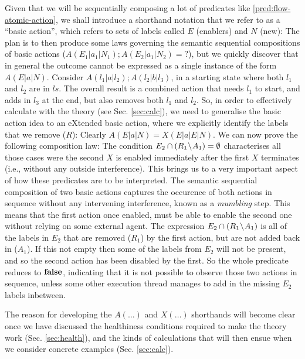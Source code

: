Given that we will be sequentially composing a lot of predicates
like \ref{pred:flow-atomic-action},
we shall introduce a shorthand notation that we refer to as
a ``basic action'',
which refers to sets of labels called $E$ (enablers) and $N$ (new):
The plan is to then produce some laws governing
the semantic sequential compositions of basic actions
($A(E_1|a_1|N_1);A(E_2|a_1|N_2) = ?$),
but we quickly discover that
in general the outcome cannot be expressed as a single instance
of the form $A(E|a|N)$.
Consider $A(l_1|a|l_2);A(l_2|b|l_3)$,
in a starting state where both $l_1$ and $l_2$ are in $ls$.
The overall result is a combined action that needs $l_1$
to start, and adds in $l_3$ at the end,
but also removes both $l_1$ and $l_2$.
So, in order to effectively calculate with the theory
(see Sec. \ref{sec:calc}), we need to generalise the basic action idea
to an eXtended basic action,
where we explicitly identify the labels that we remove ($R$):
Clearly $A(E|a|N) = X(E|a|E|N)$.
We can now prove the following composition law:
The condition $E_2 \cap (R_1\!\setminus\! A_1) = \emptyset$
characterises all those cases were the second $X$ is enabled
immediately after the first $X$ terminates
(i.e., without any outside interference).
This brings us to a very important aspect of how these predicates are to be
interpreted.
The semantic sequential composition of two basic actions
captures the occurence of both actions in sequence without any intervening
interference, known as a \emph{mumbling} step.
This means that the first action once enabled,
must be able to enable the second one without relying on some external agent.
The expression $E_2 \cap (R_1\!\setminus\! A_1)$ is all of the labels in $E_2$
that are removed ($R_1$) by the first action, but are not added back in ($A_1$).
If this not empty then some of the labels from $E_2$ will not be present,
and so the second action has been disabled by the first.
So the whole predicate reduces to $\mathbf{false}$,
indicating that it is not possible to observe those two actions in sequence,
unless some other execution thread manages to add in the missing $E_2$ labels
inbetween.

The reason for developing the $A(\dots)$ and $X(\dots)$ shorthands
will become clear once we have discussed the healthiness conditions
required to make the theory work (Sec. \ref{sec:health}),
and the kinds of calculations that will then ensue
when we consider concrete examples (Sec. \ref{sec:calc}).
